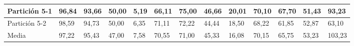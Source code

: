 \documentclass[10pt,a4paper]{article}
\begin{document}
\begin{table}[H]
{\begin{tabular}{|l|l|l|l|l|l|l|l|l|l|l|l|l|}
Partición 5-1                             & 96,84        & 93,66         & 50,00   & 5,19  & 66,11        & 75,00         & 46,66   & 20,01 & 70,10        & 67,70         & 51,43   & 93,23  \\ \hline
Partición 5-2                             & 98,59        & 94,73         & 50,00   & 6,35  & 71,11        & 72,22         & 44,44   & 18,50 & 68,22        & 61,85         & 52,87   & 63,10  \\ \hline
Media                                     & 97,22        & 95,43         & 47,00   & 7,58  & 70,55        & 71,00         & 45,33   & 16,08 & 70,15        & 65,75         & 53,23   & 103,23 \\ \hline
\end{tabular}}
\end{table}
\end{document}
